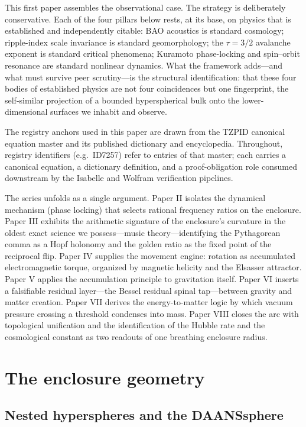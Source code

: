 \documentclass[11pt]{article}
\theoremstyle{remark}
\begin{document}
This first paper assembles the observational case. The strategy is deliberately conservative. Each of the four pillars below rests, at its base, on physics that is established and independently citable: BAO acoustics is standard cosmology; ripple-index scale invariance is standard geomorphology; the $\tau=3/2$ avalanche exponent is standard critical phenomena; Kuramoto phase-locking and spin--orbit resonance are standard nonlinear dynamics. What the framework adds---and what must survive peer scrutiny---is the structural identification: that these four bodies of established physics are not four coincidences but one fingerprint, the self-similar projection of a bounded hyperspherical bulk onto the lower-dimensional surfaces we inhabit and observe.

The registry anchors used in this paper are drawn from the TZPID canonical equation master and its published dictionary and encyclopedia. Throughout, registry identifiers (e.g.\ ID7257) refer to entries of that master; each carries a canonical equation, a dictionary definition, and a proof-obligation role consumed downstream by the Isabelle and Wolfram verification pipelines.

The series unfolds as a single argument. Paper II isolates the dynamical mechanism (phase locking) that selects rational frequency ratios on the enclosure. Paper III exhibits the arithmetic signature of the enclosure's curvature in the oldest exact science we possess---music theory---identifying the Pythagorean comma as a Hopf holonomy and the golden ratio as the fixed point of the reciprocal flip. Paper IV supplies the movement engine: rotation as accumulated electromagnetic torque, organized by magnetic helicity and the Elsasser attractor. Paper V applies the accumulation principle to gravitation itself. Paper VI inserts a falsifiable residual layer---the Bessel residual spinal tap---between gravity and matter creation. Paper VII derives the energy-to-matter logic by which vacuum pressure crossing a threshold condenses into mass. Paper VIII closes the arc with topological unification and the identification of the Hubble rate and the cosmological constant as two readouts of one breathing enclosure radius.

\section{The enclosure geometry}
\label{sec:geometry}

\subsection{Nested hyperspheres and the DAANSsphere}
\end{document}
